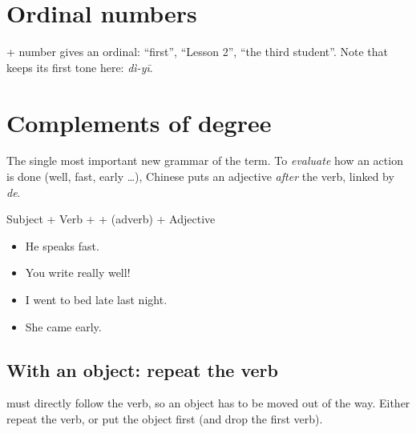 \section{Ordinal numbers}

 + number gives an ordinal:  ``first'',  ``Lesson 2'',
 ``the third student''. Note that  keeps its first tone here:
\emph{dì-yī}.

\section{Complements of degree}

The single most important new grammar of the term. To \emph{evaluate} how an action is
done (well, fast, early \ldots), Chinese puts an adjective \emph{after} the verb, linked
by  \emph{de}.

\begin{definition}
\begin{center}
Subject + Verb +  + (adverb) + Adjective
\end{center}
\end{definition}

\begin{itemize}
  \item {} He speaks fast.
  \item {} You write really well!
  \item {} I went to bed late last night.
  \item {} She came early.
\end{itemize}

\subsection{With an object: repeat the verb}

 must directly follow the verb, so an object has to be moved out of the way.
Either repeat the verb, or put the object first (and drop the first verb).

